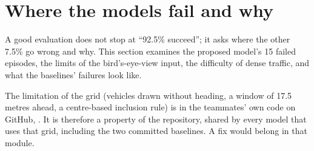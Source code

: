 \section{Where the models fail and why}\label{sec:failure}

\begin{plainwords}
A good evaluation does not stop at ``92.5\% succeed''; it asks where the other 7.5\% go wrong and why. This section examines the proposed model's 15 failed episodes, the limits of the bird's-eye-view input, the difficulty of dense traffic, and what the baselines' failures look like.
\end{plainwords}
\begin{cautionbox}
The limitation of the grid (vehicles drawn without heading, a window of 17.5 metres ahead, a centre-based inclusion rule) is in the teammates' own code on GitHub, . It is therefore a property of the repository, shared by every model that uses that grid, including the two committed baselines. A fix would belong in that module.
\end{cautionbox}



